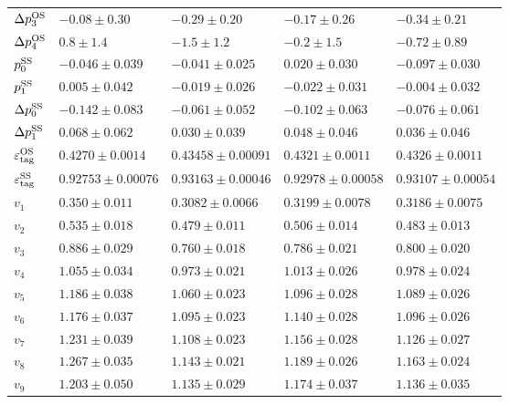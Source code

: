 \begin{table}[ht!]
{\begin{tabular}{lllll}
    $\Delta p_{3}^{\rm OS}$ & $-0.08\pm0.30$ &  $-0.29\pm0.20$ & $-0.17\pm0.26$ & $-0.34\pm0.21$\\
    $\Delta p_{4}^{\rm OS}$ & $0.8\pm1.4$ &  $-1.5\pm1.2$ & $-0.2\pm1.5$ & $-0.72\pm0.89$\\
    \midrule
    $p_{0}^{\rm SS}$ & $-0.046\pm0.039$ &  $-0.041\pm0.025$ & $0.020\pm0.030$ & $-0.097\pm0.030$\\
    $p_{1}^{\rm SS}$ & $0.005\pm0.042$ &  $-0.019\pm0.026$ & $-0.022\pm0.031$ & $-0.004\pm0.032$\\
    $\Delta p_{0}^{\rm SS}$ & $-0.142\pm0.083$ & $-0.061\pm0.052$ & $-0.102\pm0.063$ & $-0.076\pm0.061$\\
    $\Delta p_{1}^{\rm SS}$ & $0.068\pm0.062$ & $0.030\pm0.039$ & $0.048\pm0.046$ & $0.036\pm0.046$\\
    \midrule
    $\varepsilon_{\rm tag}^{\rm OS}$ & $0.4270\pm0.0014$ & $0.43458\pm0.00091$ & $0.4321\pm0.0011$ & $0.4326\pm0.0011$\\
    $\varepsilon_{\rm tag}^{\rm SS}$ & $0.92753\pm0.00076$ & $0.93163\pm0.00046$ & $0.92978\pm0.00058$ & $0.93107\pm0.00054$\\
    \midrule
    $v_{1}$ & $0.350\pm0.011$ & $0.3082\pm0.0066$ & $0.3199\pm0.0078$ & $0.3186\pm0.0075$ \\
    $v_{2}$ & $0.535\pm0.018$ & $0.479\pm0.011$ & $0.506\pm0.014$ & $0.483\pm0.013$\\
    $v_{3}$ & $0.886\pm0.029$ & $0.760\pm0.018$ & $0.786\pm0.021$ & $0.800\pm0.020$ \\
    $v_{4}$ & $1.055\pm0.034$ & $0.973\pm0.021$ & $1.013\pm0.026$ & $0.978\pm0.024$\\
    $v_{5}$ & $1.186\pm0.038$ & $1.060\pm0.023$ & $1.096\pm0.028$ & $1.089\pm0.026$\\
    $v_{6}$ & $1.176\pm0.037$ & $1.095\pm0.023$ & $1.140\pm0.028$ & $1.096\pm0.026$\\
    $v_{7}$ & $1.231\pm0.039$ & $1.108\pm0.023$ & $1.156\pm0.028$ & $1.126\pm0.027$\\
    $v_{8}$ & $1.267\pm0.035$ & $1.143\pm0.021$ & $1.189\pm0.026$ & $1.163\pm0.024$\\
    $v_{9}$ & $1.203\pm0.050$ & $1.135\pm0.029$ & $1.174\pm0.037$ & $1.136\pm0.035$\\
    \bottomrule
  \end{tabular}
  }
\end{table}

